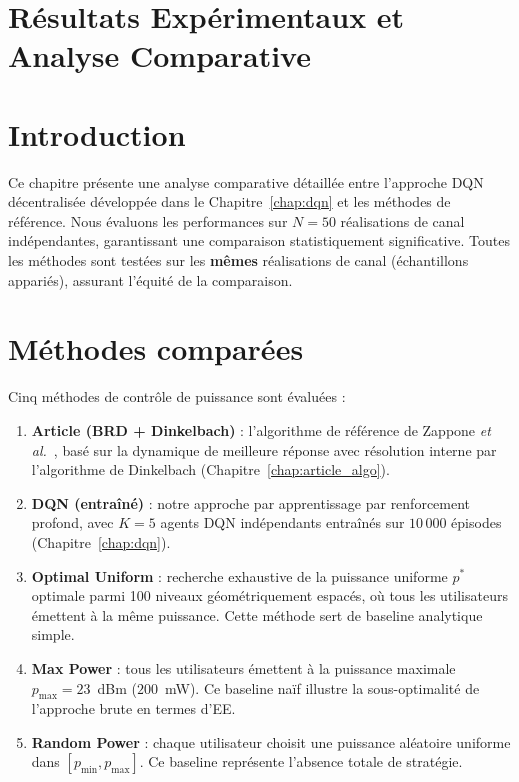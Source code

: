 \documentclass[conference]{IEEEtran}
\begin{document}

\section{Résultats Expérimentaux et Analyse Comparative}

\label{chap:results}

\section{Introduction}

Ce chapitre présente une analyse comparative détaillée entre l'approche DQN décentralisée développée dans le Chapitre~\ref{chap:dqn} et les méthodes de référence. Nous évaluons les performances sur $N = 50$ réalisations de canal indépendantes, garantissant une comparaison statistiquement significative. Toutes les méthodes sont testées sur les \textbf{mêmes} réalisations de canal (échantillons appariés), assurant l'équité de la comparaison.

\section{Méthodes comparées}
\label{sec:methods}

Cinq méthodes de contrôle de puissance sont évaluées :

\begin{enumerate}
    \item \textbf{Article (BRD + Dinkelbach)} : l'algorithme de référence de Zappone \textit{et al.}~\cite{zappone2015}, basé sur la dynamique de meilleure réponse avec résolution interne par l'algorithme de Dinkelbach (Chapitre~\ref{chap:article_algo}).

    \item \textbf{DQN (entraîné)} : notre approche par apprentissage par renforcement profond, avec $K = 5$ agents DQN indépendants entraînés sur $10\,000$ épisodes (Chapitre~\ref{chap:dqn}).

    \item \textbf{Optimal Uniform} : recherche exhaustive de la puissance uniforme $p^*$ optimale parmi 100 niveaux géométriquement espacés, où tous les utilisateurs émettent à la même puissance. Cette méthode sert de baseline analytique simple.

    \item \textbf{Max Power} : tous les utilisateurs émettent à la puissance maximale $p_{\max} = 23$~dBm ($200$~mW). Ce baseline naïf illustre la sous-optimalité de l'approche brute en termes d'EE.

    \item \textbf{Random Power} : chaque utilisateur choisit une puissance aléatoire uniforme dans $[p_{\min}, p_{\max}]$. Ce baseline représente l'absence totale de stratégie.
\end{enumerate}
\end{document}
